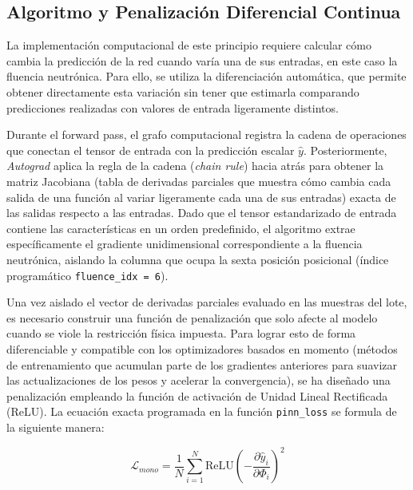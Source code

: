 \documentclass[a4paper, 12pt, twocolumn]{book}
\begin{document}
\subsection{Algoritmo y Penalización Diferencial Continua}

La implementación computacional de este principio requiere calcular cómo cambia la predicción de la red cuando varía una de sus entradas, en este caso la fluencia neutrónica. Para ello, se utiliza la diferenciación automática, que permite obtener directamente esta variación sin tener que estimarla comparando predicciones realizadas con valores de entrada ligeramente distintos.

Durante el forward pass, el grafo computacional registra la cadena de operaciones que conectan el tensor de entrada con la predicción escalar $\hat{y}$. Posteriormente, \textit{Autograd} aplica la regla de la cadena (\textit{chain rule}) hacia atrás para obtener la matriz Jacobiana (tabla de derivadas parciales que muestra cómo cambia cada salida de una función al variar ligeramente cada una de sus entradas) exacta de las salidas respecto a las entradas. Dado que el tensor estandarizado de entrada contiene las características en un orden predefinido, el algoritmo extrae específicamente el gradiente unidimensional correspondiente a la fluencia neutrónica, aislando la columna que ocupa la sexta posición posicional (índice programático \texttt{fluence\_idx = 6}).

Una vez aislado el vector de derivadas parciales evaluado en las muestras del lote, es necesario construir una función de penalización que solo afecte al modelo cuando se viole la restricción física impuesta. Para lograr esto de forma diferenciable y compatible con los optimizadores basados en momento (métodos de entrenamiento que acumulan parte de los gradientes anteriores para suavizar las actualizaciones de los pesos y acelerar la convergencia), se ha diseñado una penalización empleando la función de activación de Unidad Lineal Rectificada (ReLU). La ecuación exacta programada en la función \texttt{pinn\_loss} se formula de la siguiente manera:

\begin{equation}
    \mathcal{L}_{mono} = \frac{1}{N} \sum_{i=1}^{N} \text{ReLU}\left(- \frac{\partial \hat{y}_i}{\partial \Phi_i}\right)^2
\end{equation}
\end{document}
